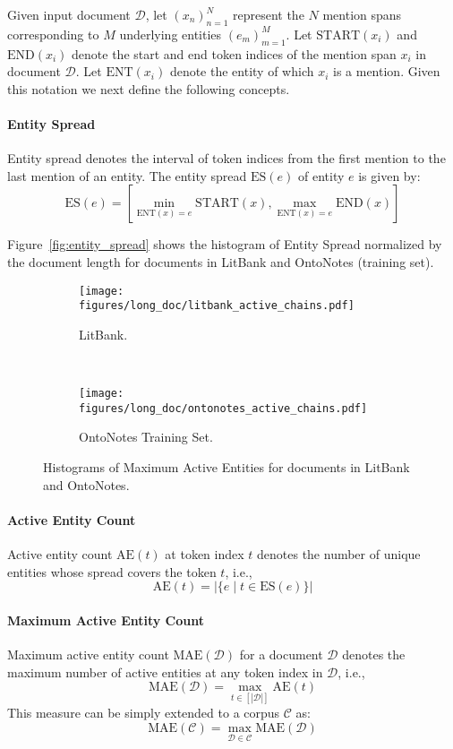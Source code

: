 \documentclass[12pt]{thesis-umich}[thesis]
\begin{document}
\label{sec:active}
Given input document $\mathcal{D}$, let $(x_n)_{n=1}^N$ represent the $N$ mention spans corresponding to $M$ underlying entities $(e_m)_{m=1}^M$. Let $\textrm{START}(x_i)$ and $\textrm{END}(x_i)$ denote the start and end token indices of the mention span $x_i$ in document $\mathcal{D}$.
Let $\textrm{ENT}(x_i)$ denote the entity of which $x_i$ is a mention.
Given this notation we next define the following concepts.


\paragraph{Entity Spread} Entity spread denotes the interval of token indices from the first mention to the last mention of an entity. The entity spread $\textrm{ES}(e)$ of entity $e$ is given by: $$\textrm{ES}(e) = [\min_{\textrm{ENT}(x) = e}\textrm{START}(x), \max_{\textrm{ENT}(x) = e}\textrm{END}(x)]$$

Figure~\ref{fig:entity_spread} shows the histogram of Entity Spread normalized by the document length for documents in LitBank and OntoNotes (training set).    

\begin{figure*}[t]
\centering
\begin{subfigure}[b]{0.45\textwidth}
        \centering
        \texttt{[image: figures/long\_doc/litbank\_active\_chains.pdf]}
        \caption{LitBank.}
        \label{fig:litbank_active}
    \end{subfigure}~
    \begin{subfigure}[b]{0.45\textwidth}
        \centering
        \texttt{[image: figures/long\_doc/ontonotes\_active\_chains.pdf]}
        \caption{OntoNotes Training Set.}
        \label{fig:ontonotes_active}
    \end{subfigure}
    \caption{Histograms of Maximum Active Entities for documents in LitBank and OntoNotes.}
    \label{fig:active_chains}
\end{figure*}
 
\paragraph{Active Entity Count}
Active entity count $\textrm{AE}(t)$ at token index $t$  denotes the number of unique entities whose spread covers the token $t$, i.e.,
$$\textrm{AE}(t) = |\{e \;|\; t \in \textrm{ES}(e) \}|$$

\paragraph{Maximum Active Entity Count}
Maximum active entity count $\textrm{MAE}(\mathcal{D})$ for a document $\mathcal{D}$ denotes the maximum number of active entities at any token index in $\mathcal{D}$, i.e.,
$$\textrm{MAE}(\mathcal{D}) = \max_{t \in [|\mathcal{D}|]} \textrm{AE}(t)$$ 
This measure can be simply extended to a corpus $\mathcal{C}$ as: $$\textrm{MAE}(\mathcal{C}) = \max_{\mathcal{D} \in \mathcal{C}} \textrm{MAE}(\mathcal{D})$$ 
\end{document}
